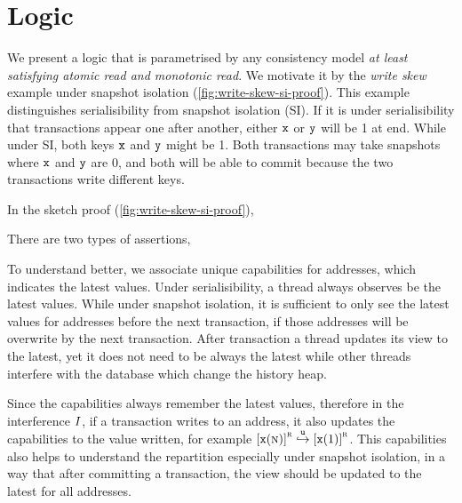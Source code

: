 \section{Logic}


We present a logic that is parametrised by any consistency model \emph{at least satisfying atomic  read and monotonic read}.
We motivate it by the \emph{write skew} example under snapshot isolation (\cref{fig:write-skew-si-proof}).
This example distinguishes serialisibility from snapshot isolation (SI).
If it is under serialisibility that transactions appear one after another, either \( \texttt{x} \) or \( \texttt{y} \) will be 1 at end.
While under SI, both keys \( \texttt{x} \) and \( \texttt{y} \) might be 1.
Both transactions may take snapshots where \( \texttt{x} \) and \( \texttt{y} \) are 0, and both will be able to commit because the two transactions write different keys.

In the sketch proof (\cref{fig:write-skew-si-proof}), 

There are two types of assertions, 

To understand better, we associate unique capabilities for addresses, which indicates the latest values.
Under serialisibility, a thread always observes be the latest values.
While under snapshot isolation, it is sufficient to only see the latest values for addresses before the next transaction, if those addresses will be overwrite by the next transaction.
After transaction a thread updates its view to the latest, yet it does not need to be always the latest while other threads interfere with the database which change the history heap.

Since the capabilities always remember the latest values, therefore in the interference \( I \), if a transaction writes to an address, it also updates the capabilities to the value written, for example \( \cass{\CB{x}(\V n)}{\lrid} \fpU \cass{\CB{x}(1)}{\lrid} \).
This capabilities also helps to understand the repartition especially under snapshot isolation, in a way that after committing a transaction, the view should be updated to the latest for all addresses.

